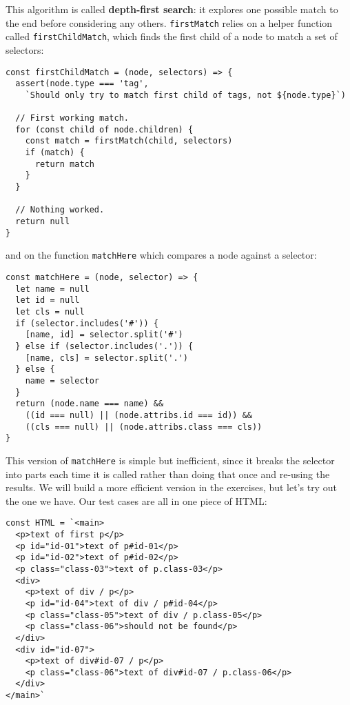 \documentclass[krantzl]{krantz}
\newcommand{\glossref}[1]{\textbf{#1}}
\begin{document}
This algorithm is called \glossref{depth-first search}:
it explores one possible match to the end before considering any others.
\texttt{firstMatch} relies on a helper function called \texttt{firstChildMatch},
which finds the first child of a node to match a set of selectors:


\begin{lstlisting}[frame=single,frameround=tttt]
const firstChildMatch = (node, selectors) => {
  assert(node.type === 'tag',
    `Should only try to match first child of tags, not ${node.type}`)

  // First working match.
  for (const child of node.children) {
    const match = firstMatch(child, selectors)
    if (match) {
      return match
    }
  }

  // Nothing worked.
  return null
}
\end{lstlisting}



\noindent and on the function \texttt{matchHere} which compares a node against a selector:


\begin{lstlisting}[frame=single,frameround=tttt]
const matchHere = (node, selector) => {
  let name = null
  let id = null
  let cls = null
  if (selector.includes('#')) {
    [name, id] = selector.split('#')
  } else if (selector.includes('.')) {
    [name, cls] = selector.split('.')
  } else {
    name = selector
  }
  return (node.name === name) &&
    ((id === null) || (node.attribs.id === id)) &&
    ((cls === null) || (node.attribs.class === cls))
}
\end{lstlisting}



This version of \texttt{matchHere} is simple but inefficient,
since it breaks the selector into parts each time it is called
rather than doing that once and re-using the results.
We will build a more efficient version in the exercises,
but let's try out the one we have.
Our test cases are all in one piece of HTML:


\begin{lstlisting}[frame=single,frameround=tttt]
const HTML = `<main>
  <p>text of first p</p>
  <p id="id-01">text of p#id-01</p>
  <p id="id-02">text of p#id-02</p>
  <p class="class-03">text of p.class-03</p>
  <div>
    <p>text of div / p</p>
    <p id="id-04">text of div / p#id-04</p>
    <p class="class-05">text of div / p.class-05</p>
    <p class="class-06">should not be found</p>
  </div>
  <div id="id-07">
    <p>text of div#id-07 / p</p>
    <p class="class-06">text of div#id-07 / p.class-06</p>
  </div>
</main>`
\end{lstlisting}
\end{document}
